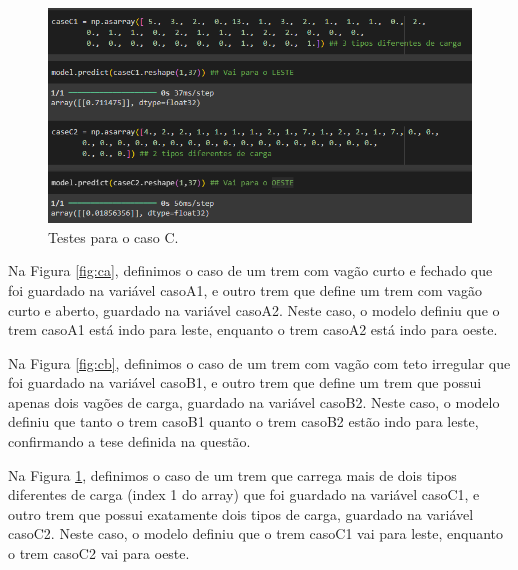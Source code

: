 \documentclass[12pt]{article}
\begin{document}
\begin{figure}[H]
    \centering
    \includegraphics[width=0.8\linewidth]{3CC.png}
    \caption{Testes para o caso C.}
    \label{fig:cc}
\end{figure}

Na Figura \ref{fig:ca}, definimos o caso de um trem com vagão curto e fechado que foi guardado na variável casoA1, e outro trem que define um trem com vagão curto e aberto, guardado na variável casoA2. Neste caso, o modelo definiu que o trem casoA1 está indo para leste, enquanto o trem casoA2 está indo para oeste. 

Na Figura \ref{fig:cb}, definimos o caso de um trem com vagão com teto irregular que foi guardado na variável casoB1, e outro trem que define um trem que possui apenas dois vagões de carga, guardado na variável casoB2. Neste caso, o modelo definiu que tanto o trem casoB1 quanto o trem casoB2 estão indo para leste, confirmando a tese definida na questão.

Na Figura \ref{fig:cc}, definimos o caso de um trem que carrega mais de dois tipos diferentes de carga (index 1 do array) que foi guardado na variável casoC1, e outro trem que possui exatamente dois tipos de carga, guardado na variável casoC2. Neste caso, o modelo definiu que o trem casoC1 vai para leste, enquanto o trem casoC2 vai para oeste.



\end{document}
